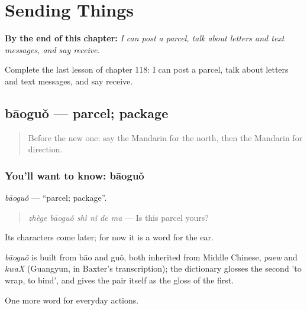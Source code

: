 
\chapter{Sending Things}
\label{ch:zh-sending-things}

\begin{chapteropening}
\textbf{By the end of this chapter:} \emph{I can post a parcel, talk about letters and text messages, and say receive.}

Complete the last lesson of chapter 118: I can post a parcel, talk about letters and text messages, and say receive.
\end{chapteropening}

\section[bāoguǒ]{bāoguǒ — parcel; package}

\label{lesson:ZH-C118-baoguo}



\begin{quote}
Before the new one: say the Mandarin for the north, then the Mandarin for direction.
\end{quote}

\subsection*{You'll want to know: bāoguǒ}
\emph{bāoguǒ} — \textquotedblleft{}parcel; package\textquotedblright{}.

\begin{quote}
\emph{zhège bāoguǒ shì nǐ de ma} — Is this parcel yours?
\end{quote}

Its characters come later; for now it is a word for the ear.

\begin{cousinweb}
\emph{bāoguǒ} is built from bāo and guǒ, both inherited from Middle Chinese, \emph{paew} and \emph{kwaX} (Guangyun, in Baxter's transcription); the dictionary glosses the second 'to wrap, to bind', and gives the pair itself as the gloss of the first.
\end{cousinweb}

\begin{grammarlens}[title={What you've built}]
One more word for everyday actions.
\end{grammarlens}

